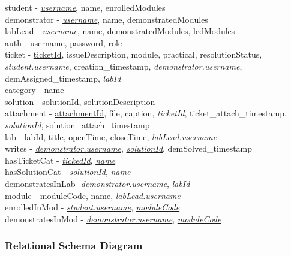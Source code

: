 \noindent student - \underline{\textit{username}}, name, enrolledModules \\
demonstrator - \underline{\textit{username}}, name, demonstratedModules \\
labLead - \underline{\textit{username}}, name, demonstratedModules, ledModules \\
auth - \underline{username}, password, role \\
ticket - \underline{ticketId}, issueDescription, module, practical, resolutionStatus, \textit{student.username}, creation\_timestamp, \textit{demonstrator.username}, demAssigned\_timestamp, \textit{labId} \\
category - \underline{name} \\
solution - \underline{solutionId}, solutionDescription\\
attachment - \underline{attachmentId}, file, caption, \textit{ticketId}, ticket\_attach\_timestamp, \textit{solutionId}, solution\_attach\_timestamp\\
lab - \underline{labId}, title, openTime, closeTime, \textit{labLead.username}\\
writes - \underline{\textit{demonstrator.username}}, \underline{\textit{solutionId}}, demSolved\_timestamp\\
hasTicketCat - \underline{\textit{tickedId}}, \underline{\textit{name}}\\
hasSolutionCat - \underline{\textit{solutionId}}, \underline{\textit{name}}\\
demonstratesInLab- \underline{\textit{demonstrator.username}}, \underline{\textit{labId}}\\
module - \underline{moduleCode}, name, \textit{labLead.username}\\
enrolledInMod - \underline{\textit{student.username}}, \underline{\textit{moduleCode}}\\
demonstratesInMod - \underline{\textit{demonstrator.username}}, \underline{\textit{moduleCode}}\\

\subsubsection{Relational Schema Diagram}

